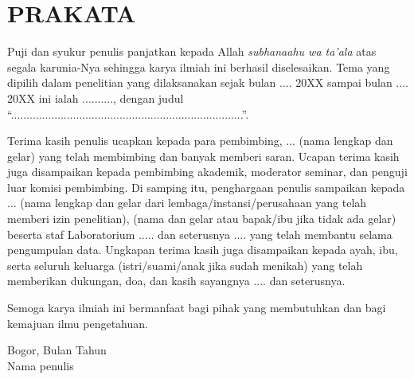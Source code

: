 
\chapter*{PRAKATA}

Puji dan syukur penulis panjatkan kepada Allah \textit{subhanaahu wa ta'ala}
atas segala karunia-Nya sehingga karya ilmiah ini berhasil diselesaikan.
Tema yang dipilih dalam penelitian yang dilaksanakan sejak bulan .... 20XX
sampai bulan .... 20XX ini ialah .........., dengan judul
``...........................................................................''.

Terima kasih penulis ucapkan kepada para pembimbing,
... (nama lengkap dan gelar) yang telah membimbing dan banyak memberi saran.
Ucapan terima kasih juga disampaikan kepada pembimbing akademik,
moderator seminar, dan penguji luar komisi pembimbing.
Di samping itu, penghargaan penulis sampaikan kepada
... (nama lengkap dan gelar dari lembaga/instansi/perusahaan yang telah memberi
izin penelitian), (nama dan gelar atau bapak/ibu jika tidak ada gelar)
beserta staf Laboratorium ..... dan seterusnya .... yang telah membantu
selama pengumpulan data.
Ungkapan terima kasih juga disampaikan kepada ayah, ibu, serta seluruh keluarga
(istri/suami/anak jika sudah menikah) yang telah memberikan dukungan,
doa, dan kasih sayangnya .... dan seterusnya.

Semoga karya ilmiah ini bermanfaat bagi pihak yang membutuhkan dan bagi
kemajuan ilmu pengetahuan.

\vspace{\baselineskip}

\begin{flushright}
Bogor, Bulan Tahun\\[\baselineskip]
Nama penulis
\end{flushright}
